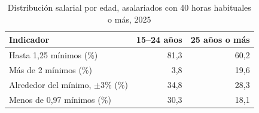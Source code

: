 \begin{table}[H]
\centering\small
\caption{Distribución salarial por edad, asalariados con 40 horas habituales o más, 2025}
\label{tab:edad}
\begin{tabular}{lrr}
\toprule
Indicador & 15--24 años & 25 años o más \\
\midrule
Hasta 1,25 mínimos (\%) & 81,3 & 60,2 \\
Más de 2 mínimos (\%) & 3,8 & 19,6 \\
Alrededor del mínimo, $\pm3\%$ (\%) & 34,8 & 28,3 \\
Menos de 0,97 mínimos (\%) & 30,3 & 18,1 \\
\bottomrule
\end{tabular}
\end{table}

